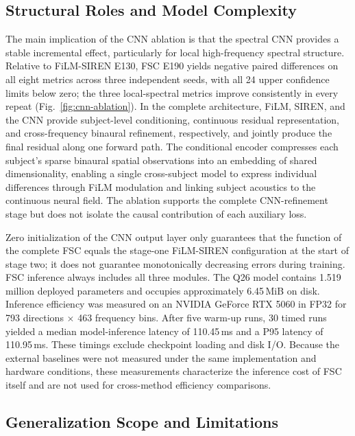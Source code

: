 \documentclass[UTF8,a4paper]{article}
\begin{document}
\subsection{Structural Roles and Model Complexity}

The main implication of the CNN ablation is that the spectral CNN provides a stable incremental effect, particularly for local high-frequency spectral structure. Relative to FiLM-SIREN E130, FSC E190 yields negative paired differences on all eight metrics across three independent seeds, with all 24 upper confidence limits below zero; the three local-spectral metrics improve consistently in every repeat (Fig.~\ref{fig:cnn-ablation}). In the complete architecture, FiLM, SIREN, and the CNN provide subject-level conditioning, continuous residual representation, and cross-frequency binaural refinement, respectively, and jointly produce the final residual along one forward path. The conditional encoder compresses each subject's sparse binaural spatial observations into an embedding of shared dimensionality, enabling a single cross-subject model to express individual differences through FiLM modulation and linking subject acoustics to the continuous neural field. The ablation supports the complete CNN-refinement stage but does not isolate the causal contribution of each auxiliary loss.

Zero initialization of the CNN output layer only guarantees that the function of the complete FSC equals the stage-one FiLM-SIREN configuration at the start of stage two; it does not guarantee monotonically decreasing errors during training. FSC inference always includes all three modules. The Q26 model contains 1.519 million deployed parameters and occupies approximately 6.45\,MiB on disk. Inference efficiency was measured on an NVIDIA GeForce RTX 5060 in FP32 for 793 directions $\times$ 463 frequency bins. After five warm-up runs, 30 timed runs yielded a median model-inference latency of 110.45\,ms and a P95 latency of 110.95\,ms. These timings exclude checkpoint loading and disk I/O. Because the external baselines were not measured under the same implementation and hardware conditions, these measurements characterize the inference cost of FSC itself and are not used for cross-method efficiency comparisons.

\subsection{Generalization Scope and Limitations}
\end{document}
